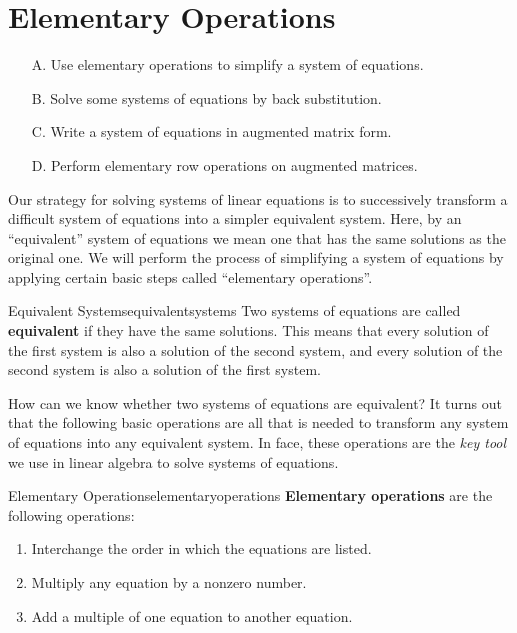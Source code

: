\section{Elementary Operations}

\begin{outcome}
  \begin{enumerate}
  \item[A.] Use elementary operations to simplify a system of
    equations.
  \item[B.] Solve some systems of equations by back substitution.
  \item[C.] Write a system of equations in augmented matrix form.
  \item[D.] Perform elementary row operations on augmented matrices.
  \end{enumerate}
\end{outcome}

Our strategy for solving systems of linear equations is to
successively transform a difficult system of equations into a simpler
equivalent system. Here, by an ``equivalent'' system of equations we
mean one that has the same solutions as the original one. We will
perform the process of simplifying a system of equations by applying
certain basic steps called ``elementary operations''.

\begin{definition}{Equivalent Systems}{equivalentsystems}
  Two systems of equations are called
  \textbf{equivalent}
  if they have the same solutions. This means that every solution of
  the first system is also a solution of the second system, and every
  solution of the second system is also a solution of the first system.
\end{definition}

How can we know whether two systems of equations are equivalent? It
turns out that the following basic operations are all that is needed
to transform any system of equations into any equivalent system. In
face, these operations are the {\em key tool} we use in linear algebra
to solve systems of equations.

\begin{definition}{Elementary Operations}{elementaryoperations}
\textbf{Elementary operations}  are the
following operations:

\begin{enumerate}
\item Interchange the order in which the equations are listed.

\item Multiply any equation by a nonzero number.

\item Add a multiple of one equation to another equation.
\end{enumerate}
\end{definition}

